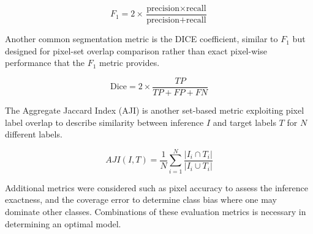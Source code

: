 \begin{equation}
    F_1 = 2 \times \frac{\text{precision} \times \text{recall}}{\text{precision} + \text{recall}}
\end{equation}

Another common segmentation metric is the DICE coefficient, similar to $F_1$ but designed for pixel-set overlap comparison rather than exact pixel-wise performance that the $F_1$ metric provides.

\begin{equation}
    \text{Dice} = 2 \times \frac{TP}{TP + FP + FN}
\end{equation}

The Aggregate Jaccard Index (AJI) is another set-based metric exploiting pixel label overlap to describe similarity between inference $I$ and target labels $T$ for $N$ different labels.

\begin{equation}
    AJI(I, T) = \frac{1}{N} \sum_{i=1}^{N} \frac{|I_i \cap T_i|}{|I_i \cup T_i|}
\end{equation}

Additional metrics were considered such as pixel accuracy to assess the inference exactness, and the coverage error to determine class bias where one may dominate other classes. Combinations of these evaluation metrics is necessary in determining an optimal model.


